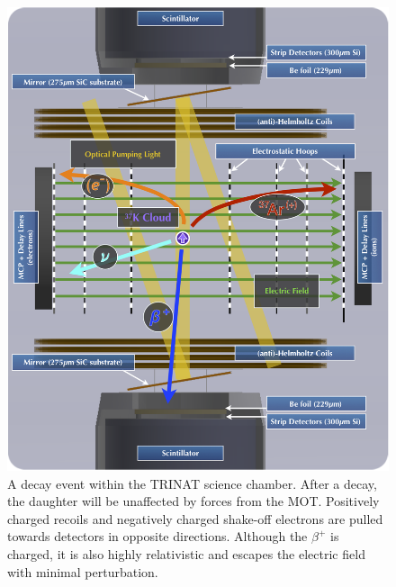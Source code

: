 \begin{figure}[h!!!!!t!!!!!]
	\centering
	\includegraphics[width=.9\linewidth]{Figures/chamber_cross_section_with_event.png}
	\caption{A decay event within the TRINAT science chamber.  After a decay, the daughter will be unaffected by forces from the MOT.  Positively charged recoils and negatively charged shake-off electrons are pulled towards detectors in opposite directions.  Although the $\beta^+$ is charged, it is also highly relativistic and escapes the electric field with minimal perturbation.}
	\label{chamber_decayevent}
\end{figure}


